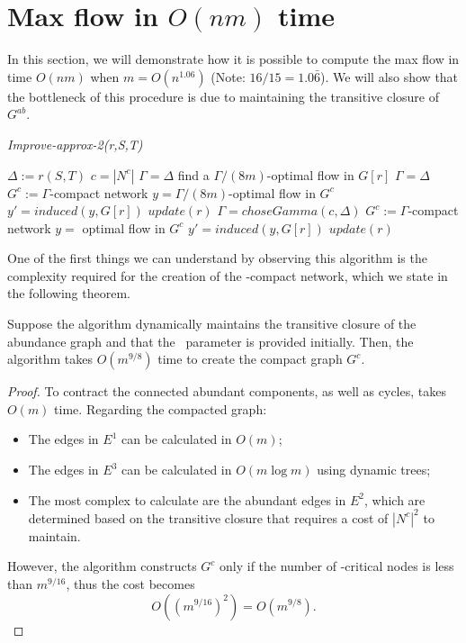 \section{Max flow in $O(nm)$ time}

In this section, we will demonstrate how it is possible to compute the max flow in time \( O(nm) \) when \( m = O(n^{1.06}) \) (Note: \( 16/15 = 1.0\bar{6} \)). We will also show that the bottleneck of this procedure is due to maintaining the transitive closure of \( G^{ab} \).

\begin{algorithm}
\caption{\textit{Improve-approx-2(r,S,T)}}
\label{imp2}
\begin{algorithmic}[1]
\State $\Delta := r(S,T)$
\State $c = |N^c|$
    \State $\Gamma = \Delta$
    \State find a $\Gamma/(8m)$-optimal flow in $G[r]$
    \State $\Gamma = \Delta$
    \State $G^c:= \Gamma$-compact network
    \State $y=\Gamma/(8m)$-optimal flow in $G^c$
    \State $y' = induced(y, G[r])$
    \State $update(r)$
    \State $\Gamma = choseGamma(c, \Delta)$
    \State $G^c:= \Gamma$-compact network
    \State $y=$ optimal flow in $G^c$
    \State $y' = induced(y, G[r])$
    \State $update(r)$
\EndIf
\end{algorithmic}
\end{algorithm}

One of the first things we can understand by observing this algorithm is the complexity required for the creation of the \gmm-compact network, which we state in the following theorem.

\begin{theorem}
    \label{tgcomp}
    Suppose the algorithm dynamically maintains the transitive closure of the abundance graph and that the \gmm\ parameter is provided initially. Then, the algorithm takes \( O(m^{9/8}) \) time to create the compact graph \( G^c \).
\end{theorem}

\begin{proof}
    To contract the connected abundant components, as well as cycles, takes \( O(m) \) time. Regarding the compacted graph:
    \begin{itemize}
        \item The edges in \( E^1 \) can be calculated in \( O(m) \);
        \item The edges in \( E^3 \) can be calculated in \( O(m \log m) \) using dynamic trees;
        \item The most complex to calculate are the abundant edges in \( E^2 \), which are determined based on the transitive closure that requires a cost of \( |N^c|^2 \) to maintain.
    \end{itemize}
    However, the algorithm constructs \( G^c \) only if the number of \gmm-critical nodes is less than \( m^{9/16} \), thus the cost becomes
    \[
    O((m^{9/16})^2) = O(m^{9/8}).
    \]
\end{proof}


